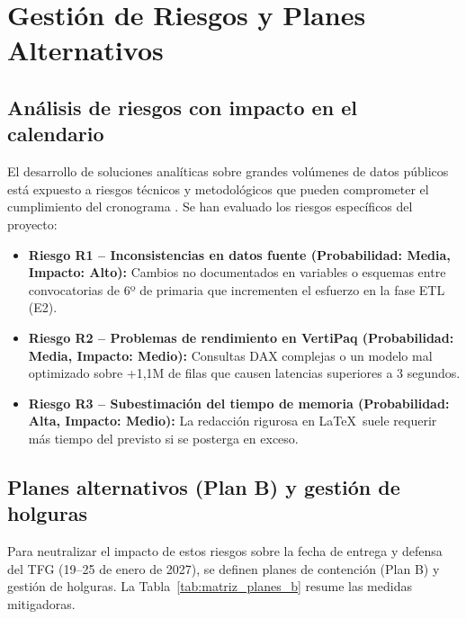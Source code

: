 \documentclass[12pt, a4paper, twoside]{report}
\begin{document}

\chapter{Gestión de Riesgos y Planes Alternativos}
\enlargethispage{2.5cm} %

\section{Análisis de riesgos con impacto en el calendario}
El desarrollo de soluciones analíticas sobre grandes volúmenes de datos públicos está expuesto a riesgos técnicos y metodológicos que pueden comprometer el cumplimiento del cronograma \cite{pmi2021pmbok}. Se han evaluado los riesgos específicos del proyecto:

\begin{itemize}[noitemsep, topsep=1pt, parsep=0pt]
    \item \textbf{Riesgo R1 -- Inconsistencias en datos fuente (Probabilidad: Media, Impacto: Alto):} Cambios no documentados en variables o esquemas entre convocatorias de 6º de primaria que incrementen el esfuerzo en la fase ETL (E2).
    \item \textbf{Riesgo R2 -- Problemas de rendimiento en VertiPaq (Probabilidad: Media, Impacto: Medio):} Consultas DAX complejas o un modelo mal optimizado sobre +1,1M de filas que causen latencias superiores a 3 segundos.
    \item \textbf{Riesgo R3 -- Subestimación del tiempo de memoria (Probabilidad: Alta, Impacto: Medio):} La redacción rigurosa en \LaTeX\ suele requerir más tiempo del previsto si se posterga en exceso.
\end{itemize}

\section{Planes alternativos (Plan B) y gestión de holguras}
Para neutralizar el impacto de estos riesgos sobre la fecha de entrega y defensa del TFG (19--25 de enero de 2027), se definen planes de contención (Plan B) y gestión de holguras. La Tabla~\ref{tab:matriz_planes_b} resume las medidas mitigadoras.
\end{document}
